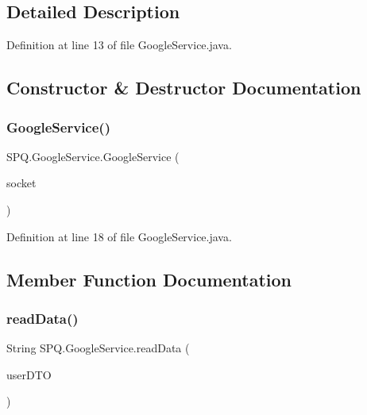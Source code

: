\subsection{Detailed Description}


Definition at line 13 of file Google\+Service.\+java.



\subsection{Constructor \& Destructor Documentation}
\mbox{\label{class_s_p_q_1_1_google_service_aa585d2611aa3d84e9cdbc67609207c99}} 
\subsubsection{\texorpdfstring{Google\+Service()}{GoogleService()}}
{\footnotesize\ttfamily S\+P\+Q.\+Google\+Service.\+Google\+Service (\begin{DoxyParamCaption}\item[{Socket}]{socket }\end{DoxyParamCaption})}



Definition at line 18 of file Google\+Service.\+java.



\subsection{Member Function Documentation}
\mbox{\label{class_s_p_q_1_1_google_service_a94e224618cc0433776bcb49bff80067f}} 
\subsubsection{\texorpdfstring{read\+Data()}{readData()}}
{\footnotesize\ttfamily String S\+P\+Q.\+Google\+Service.\+read\+Data (\begin{DoxyParamCaption}\item[{\mbox{\hyperlink{class_s_p_q_1_1dto_1_1_user_d_t_o}{User\+D\+TO}}}]{user\+D\+TO }\end{DoxyParamCaption})}



